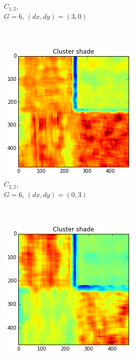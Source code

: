 \documentclass[a4paper]{article}
\begin{document}
\begin{figure}
\begin{subfigure}[b]{0.30\textwidth}
        \caption{%
            $C_{1,2}$, \\
            $G=6$, $(dx, dy)=(3,0)$
        }
        \label{fig:c12}
    \end{subfigure}
    ~
    \begin{subfigure}[b]{0.30\textwidth}
        \centering
        \includegraphics[width=\textwidth]{cls22.png}
        \caption{%
            $C_{2,2}$, \\
            $G=6$, $(dx, dy)=(0,3)$
        }
        \label{fig:c22}
    \end{subfigure}
    ~
    \begin{subfigure}[b]{0.30\textwidth}
        \centering
        \includegraphics[width=\textwidth]{cls32.png}

\end{subfigure}
\end{figure}
\end{document}
